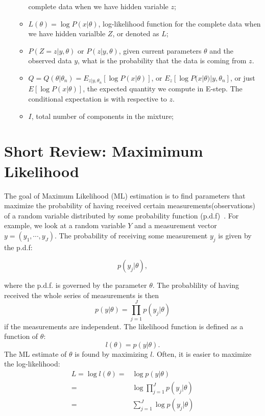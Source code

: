 \documentclass{article}  %
\begin{document}
\begin{enumerate}
\begin{itemize}
  complete data when we have hidden variable $z$;
  \item $L(\theta) = \log P(x|\theta)$, log-likelihood function for the
  complete data when we have hidden varialble $Z$, or denoted as $L$;
  \item $P(Z=z|y,\theta)$ or $P(z|y,\theta)$, given current parameters $
  \theta$ and the observed data $y$, what is the probability that the data is coming from $z$.
  \item $Q = Q(\theta|\theta_n)= E_{z|y,\theta_n}[\log P(x|\theta)]$, or
  $E_{z}[\log P(x|\theta) | y,\theta_n] $, or just $E[\log
  P(x|\theta)]$, the expected quantity we compute in
  E-step. The conditional expectation is with respective to $z$.
  \item $I$, total number of components in the mixture;  
  \end{itemize}
\end{enumerate}



\section{Short Review: Maximimum Likelihood}
The goal of Maximum Likelihood (ML) estimation is to find parameters that
maximize the probability of having received certain measurements(observations)
of a random variable distributed by some probability function (p.d.f)~\cite{em_mb}. For
example, we look at a random variable $Y$ and a measurement vector $y =
(y_1,\cdots,y_J)$. The probability of receiving some measurement $y_j$ is given
by the p.d.f:

\[
p(y_j|\theta),
\]

where the p.d.f. is governed by the parameter $\theta$. The probablility of
having received the whole series of measurements is then 
\[
p(y|\theta)=\prod _{j=1}^J p(y_j|\theta)
\]
if the measurements are independent. The likelihood function is defined as a
function of $\theta$:
\begin{equation}
l(\theta) = p(y|\theta).
\end{equation}
The ML estimate of $\theta$ is found by maximizing $l$. Often, it is easier to
maximize the log-likelihood:
\begin{align*}
L=\log l(\theta) = & \log p(y|\theta)\\
= & \log \prod_{j=1}^J p(y_j|\theta) \\
= & \sum _{j=1}^J \log p(y_j|\theta)
\end{align*}
\end{document}
